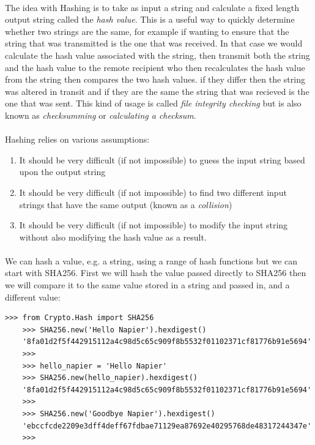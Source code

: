 \documentclass[12pt, a4paper, twoside]{book}
\begin{document}
\paragraph{} The idea with Hashing is to take as input a string and calculate a fixed length output string called the \emph{hash value}. This is a useful way to quickly determine whether two strings are the same, for example if wanting to ensure that the string that was transmitted is the one that was received. In that case we would calculate the hash value associated with the string, then transmit both the string and the hash value to the remote recipient who then recalculates the hash value from the string then compares the two hash values. if they differ then the string was altered in transit and if they are the same the string that was recieved is the one that was sent. This kind of usage is called \emph{file integrity checking} but is also known as \emph{checksumming} or \emph{calculating a checksum}.

\paragraph{} Hashing relies on various assumptions:

\begin{enumerate}
\item It should be very difficult (if not impossible) to guess the input string based upon the output string
\item It should be very difficult (if not impossible) to find two different input strings that have the same output (known as a \emph{collision})
\item It should be very difficult (if not impossible) to modify the input string without also modifying the hash value as a result.
\end{enumerate}

\paragraph{} We can hash a value, e.g. a string, using a range of hash functions but we can start with SHA256. First we will hash the value passed directly to SHA256 then we will compare it to the same value stored in a string and passed in, and a different value:

\begin{lstlisting}[style=DOS]
    >>> from Crypto.Hash import SHA256
    >>> SHA256.new('Hello Napier').hexdigest()
    '8fa01d2f5f442915112a4c98d5c65c909f8b5532f01102371cf81776b91e5694'
    >>>
    >>> hello_napier = 'Hello Napier'
    >>> SHA256.new(hello_napier).hexdigest()
    '8fa01d2f5f442915112a4c98d5c65c909f8b5532f01102371cf81776b91e5694'
    >>> 
    >>> SHA256.new('Goodbye Napier').hexdigest()
    'ebccfcde2209e3dff4deff67fdbae71129ea87692e40295768de48317244347e'
    >>>
\end{lstlisting}
\end{document}
